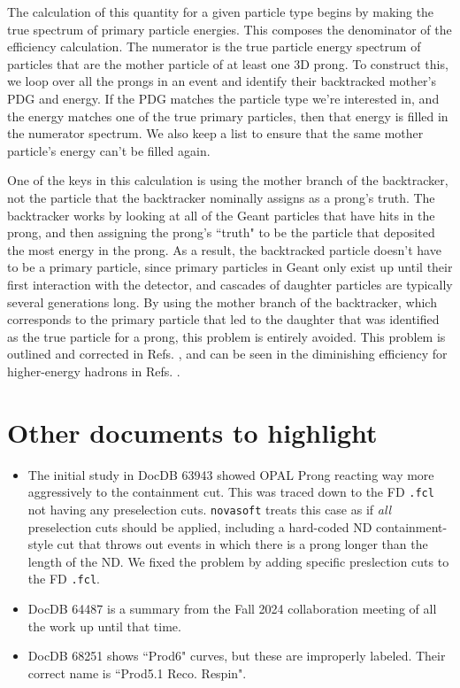 \documentclass{article}
\begin{document}
The calculation of this quantity for a given particle type begins by making the true spectrum of primary particle energies. This composes the denominator of the efficiency calculation. The numerator is the true particle energy spectrum of particles that are the mother particle of at least one 3D prong. To construct this, we loop over all the prongs in an event and identify their backtracked mother's PDG and energy. If the PDG matches the particle type we're interested in, and the energy matches one of the true primary particles, then that energy is filled in the numerator spectrum. We also keep a list to ensure that the same mother particle's energy can't be filled again.

One of the keys in this calculation is using the mother branch of the backtracker, not the particle that the backtracker nominally assigns as a prong's truth. The backtracker works by looking at all of the Geant particles that have hits in the prong, and then assigning the prong's ``truth" to be the particle that deposited the most energy in the prong. As a result, the backtracked particle doesn't have to be a primary particle, since primary particles in Geant only exist up until their first interaction with the detector, and cascades of daughter particles are typically several generations long. By using the mother branch of the backtracker, which corresponds to the primary particle that led to the daughter that was identified as the true particle for a prong, this problem is entirely avoided. This problem is outlined and corrected in Refs. \cite{68359, 69292}, and can be seen in the diminishing efficiency for higher-energy hadrons in Refs. \cite{64180, 64487, 64728, 68251}.

\section{Other documents to highlight}
\begin{itemize}
    \item The initial study in DocDB 63943 \cite{63943} showed OPAL Prong reacting way more aggressively to the containment cut. This was traced down to the FD \texttt{.fcl} not having any preselection cuts. \texttt{novasoft} treats this case as if \textit{all} preselection cuts should be applied, including a hard-coded ND containment-style cut that throws out events in which there is a prong longer than the length of the ND. We fixed the problem by adding specific preslection cuts to the FD \texttt{.fcl}.
    \item DocDB 64487 \cite{64487} is a summary from the Fall 2024 collaboration meeting of all the work up until that time.
    \item DocDB 68251 \cite{68251} shows ``Prod6" curves, but these are improperly labeled. Their correct name is ``Prod5.1 Reco. Respin". 
\end{itemize}




\end{document}
